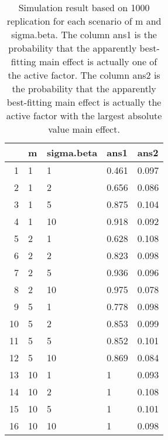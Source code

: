 \documentclass{article}\usepackage[]{graphicx}\usepackage[]{color}
\begin{document}
\begin{table}[ht]
\centering
\begin{tabular}{rllll}
  \hline
 & m & sigma.beta & ans1 & ans2 \\ 
  \hline
1 & 1 & 1 & 0.461 & 0.097 \\ 
  2 & 1 & 2 & 0.656 & 0.086 \\ 
  3 & 1 & 5 & 0.875 & 0.104 \\ 
  4 & 1 & 10 & 0.918 & 0.092 \\ 
  5 & 2 & 1 & 0.628 & 0.108 \\ 
  6 & 2 & 2 & 0.823 & 0.098 \\ 
  7 & 2 & 5 & 0.936 & 0.096 \\ 
  8 & 2 & 10 & 0.975 & 0.078 \\ 
  9 & 5 & 1 & 0.778 & 0.098 \\ 
  10 & 5 & 2 & 0.853 & 0.099 \\ 
  11 & 5 & 5 & 0.852 & 0.101 \\ 
  12 & 5 & 10 & 0.869 & 0.084 \\ 
  13 & 10 & 1 & 1 & 0.093 \\ 
  14 & 10 & 2 & 1 & 0.108 \\ 
  15 & 10 & 5 & 1 & 0.101 \\ 
  16 & 10 & 10 & 1 & 0.098 \\ 
   \hline
\end{tabular}
\caption{Simulation result based on 1000 replication 
      for each scenario of m and sigma.beta. The column ans1 is
      the probability that the apparently best-fitting main effect
      is actually one of the active factor. The column ans2 is
      the probability that the apparently best-fitting main 
      effect is actually the  active factor with the
      largest absolute value main effect. } 
\end{table}
\end{document}
